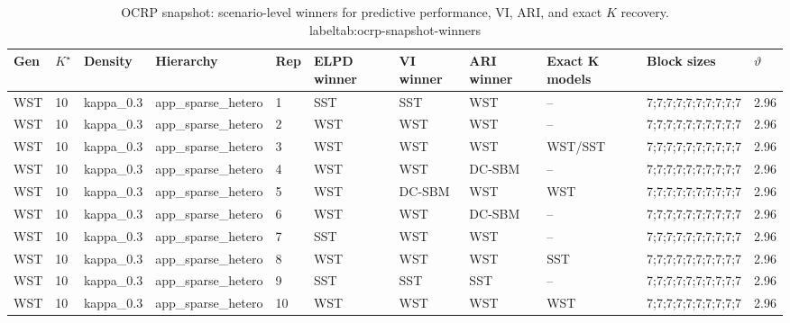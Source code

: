 \begin{table}[!h]
\centering
\caption{OCRP snapshot: scenario-level winners for predictive performance, VI, ARI, and exact $K$ recovery.\\label{tab:ocrp-snapshot-winners}}
\centering
\begin{tabular}[t]{lllllllllll}
\toprule
Gen & $K^\star$ & Density & Hierarchy & Rep & ELPD winner & VI winner & ARI winner & Exact K models & Block sizes & $\vartheta$\\
\midrule
WST & 10 & kappa_0.3 & app_sparse_hetero & 1 & SST & SST & WST & -- & 7;7;7;7;7;7;7;7;7;7 & 2.96\\
WST & 10 & kappa_0.3 & app_sparse_hetero & 2 & WST & WST & WST & -- & 7;7;7;7;7;7;7;7;7;7 & 2.96\\
WST & 10 & kappa_0.3 & app_sparse_hetero & 3 & WST & WST & WST & WST/SST & 7;7;7;7;7;7;7;7;7;7 & 2.96\\
WST & 10 & kappa_0.3 & app_sparse_hetero & 4 & WST & WST & DC-SBM & -- & 7;7;7;7;7;7;7;7;7;7 & 2.96\\
WST & 10 & kappa_0.3 & app_sparse_hetero & 5 & WST & DC-SBM & WST & WST & 7;7;7;7;7;7;7;7;7;7 & 2.96\\
WST & 10 & kappa_0.3 & app_sparse_hetero & 6 & WST & WST & DC-SBM & -- & 7;7;7;7;7;7;7;7;7;7 & 2.96\\
WST & 10 & kappa_0.3 & app_sparse_hetero & 7 & SST & WST & WST & -- & 7;7;7;7;7;7;7;7;7;7 & 2.96\\
WST & 10 & kappa_0.3 & app_sparse_hetero & 8 & WST & WST & WST & SST & 7;7;7;7;7;7;7;7;7;7 & 2.96\\
WST & 10 & kappa_0.3 & app_sparse_hetero & 9 & SST & SST & SST & -- & 7;7;7;7;7;7;7;7;7;7 & 2.96\\
WST & 10 & kappa_0.3 & app_sparse_hetero & 10 & WST & WST & WST & WST & 7;7;7;7;7;7;7;7;7;7 & 2.96\\
\bottomrule
\end{tabular}
\end{table}
